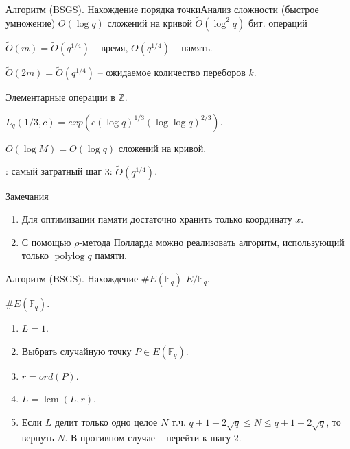 \documentclass{beamer}
\begin{document}
\begin{frame}{Алгоритм (BSGS). Нахождение порядка точки}{Анализ сложности}
 (быстрое умножение) $O(\log{q})$ сложений на кривой \structure{$\implies$} %
$\widetilde{O}(\log^2{q})$
бит. операций

 $\widetilde{O}(m) = \widetilde{O}(q^{1/4})$ -- время, $O(q^{1/4})$ -- память.

 $\widetilde{O}(2m) = \widetilde{O}(q^{1/4})$ -- ожидаемое количество переборов $k$.

 Элементарные операции в $\mathbb{Z}$.

 $L_q(1/3, c) = exp(c (\log{q})^{1/3} (\log{\log{q}})^{2/3} )$.

 $O(\log{M}) = O(\log{q})$ сложений на кривой.

: самый затратный шаг $3$: $\widetilde{O}(q^{1/4})$.

\begin{block}{Замечания}
    \begin{enumerate}
        \item Для оптимизации памяти достаточно хранить только координату $x$.
        \item С помощью $\rho$-метода Полларда можно реализовать алгоритм, использующий только $\operatorname{polylog}{q}$ памяти.
    \end{enumerate}
\end{block}
\end{frame}

\begin{frame}{Алгоритм (BSGS). Нахождение $\#E(\mathbb{F}_q)$}
     $E/\mathbb{F}_q$.
    
     $\#E(\mathbb{F}_q)$.
    \begin{enumerate}
        \item $L = 1$.
        \item Выбрать случайную точку $P \in E(\mathbb{F}_q)$.
        \item $r = ord(P)$.
        \item $L = \operatorname{lcm}(L, r)$.
        \item Если $L$ делит только одно целое $N$ т.ч. $q + 1 - 2\sqrt{q} \leq N \leq q + 1 + 2\sqrt{q}$, то вернуть $N$. В противном случае -- перейти к шагу $2$.
    \end{enumerate}
\end{frame}
\end{document}
